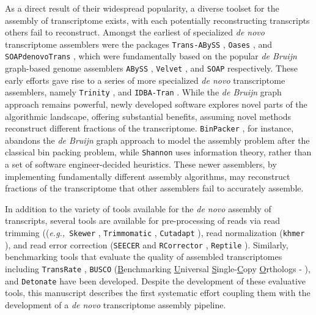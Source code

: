 \documentclass[10pt,letterpaper]{article}
\newcommand{\tit}{\textit}
\newcommand{\eg}{\textit{e.g.,}}
\begin{document}
As a direct result of their widespread popularity, a diverse toolset for the assembly of transcriptome exists, with each potentially reconstructing transcripts others fail to reconstruct. Amongst the earliest of specialized \tit{de novo} transcriptome assemblers were the packages \texttt{Trans-ABySS} \citep{Robertson:2010ih}, \texttt{Oases} \citep{Schulz:2012je}, and \texttt{SOAPdenovoTrans} \citep{Xie:2013wu}, which were fundamentally based on the popular \tit{de Bruijn} graph-based genome assemblers \texttt{ABySS} \citep{Simpson:2009iv}, \texttt{Velvet} \citep{Zerbino:2008bm}, and \texttt{SOAP} \cite{Li:2008in} respectively. These early efforts gave rise to a series of more specialized \tit{de novo} transcriptome assemblers, namely \texttt{Trinity} \citep{Haas:2013jq}, and \texttt{IDBA-Tran} \citep{Peng:2013eu}. While the \tit{de Bruijn} graph approach remains powerful, newly developed software explores novel parts of the algorithmic landscape, offering substantial benefits, assuming novel methods reconstruct different fractions of the transcriptome. \texttt{BinPacker} \citep{Liu:2016hh}, for instance, abandons the \tit{de Bruijn} graph approach to model the assembly problem after the classical bin packing problem, while \texttt{Shannon} \citep{Kannan:2016be} uses information theory, rather than a set of software engineer-decided heuristics. These newer assemblers, by implementing fundamentally different assembly algorithms, may reconstruct  fractions of the transcriptome that other assemblers fail to accurately assemble. 

In addition to the variety of tools available for the \tit{de novo} assembly of transcripts, several tools are available for pre-processing of reads via read trimming ((\eg\ \texttt{Skewer} \citep{Jiang:2014cx}, \texttt{Trimmomatic} \citep{Bolger:2014ek}, \texttt{Cutadapt} \cite{Martin:2011va}), read normalization (\texttt{khmer} \citep{Pell:2012id}), and read error correction (\texttt{SEECER} \citep{Le:2013dy} and \texttt{RCorrector} \citep{Song:2015in}, \texttt{Reptile} \cite{Yang:2010kv}). Similarly, benchmarking tools that evaluate the quality of assembled transcriptomes including \texttt{TransRate} \citep{SmithUnna:2016go}, \texttt{BUSCO} (\underline{B}enchmarking \underline{U}niversal \underline{S}ingle-\underline{C}opy \underline{O}rthologs - \citep{Simao:2015kk}), and \texttt{Detonate} \citep{Li:2014cm} have been developed. Despite the development of these evaluative tools, this manuscript describes the first systematic effort coupling them with the development of a \textit{de novo} transcriptome assembly pipeline.
\end{document}

